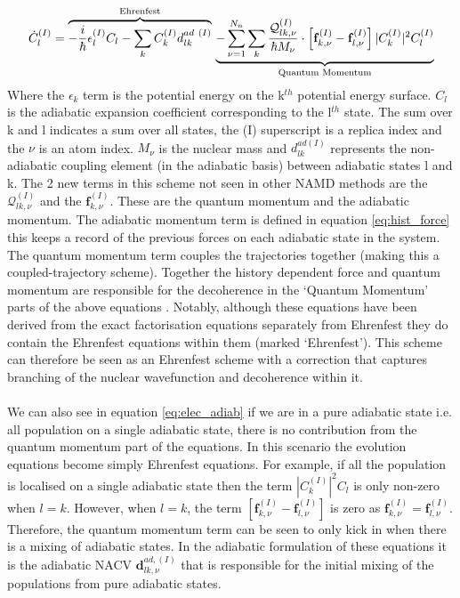 \begin{dmath}
  \dot{C}_{l}^{(I)} =
  \overbrace{
    -\frac{i}{\hbar} \epsilon_l^{(I)} C_{l}
    - \sum_k C_k^{(I)} d_{lk}^{ad \ (I)}
  }^{\text{Ehrenfest}}
  \\
  \underbrace{
    - \sum_{\nu=1}^{N_n}\sum_{k} \frac{\mathcal{Q}_{lk, \nu}^{(I)}}{\hbar M_\nu} \cdot \left[ \mathbf{f}_{k,\nu}^{(I)} - \mathbf{f}_{l,\nu}^{(I)} \right] |C_{k}^{(I)}|^2 C_{l}^{(I)}
  }_{\text{Quantum Momentum}}
  \label{eq:elec_adiab}
\end{dmath}
Where the $\epsilon_k$ term is the potential energy on the k$^{th}$ potential energy surface. $C_l$ is the adiabatic expansion coefficient corresponding to the l$^{th}$ state. The sum over k and l indicates a sum over all states, the (I) superscript is a replica index and the $\nu$ is an atom index. $M_{\nu}$ is  the nuclear mass and $d_{lk}^{ad (I)}$ represents the non-adiabatic coupling element (in the adiabatic basis) between adiabatic states l and k.
The 2 new terms in this scheme not seen in other NAMD methods are the $\mathcal{Q}_{lk, \nu}^{(I)}$ and the $\mathbf{f}_{k, \nu}^{(I)}$. These are the quantum momentum and the adiabatic momentum. The adiabatic momentum term is defined in equation \eqref{eq:hist_force} this keeps a record of the previous forces on each adiabatic state in the system. The quantum momentum term couples the trajectories together (making this a coupled-trajectory scheme). Together the history dependent force and quantum momentum are responsible for the decoherence in the `Quantum Momentum' parts of the above equations \cite{gossel_coupled-trajectory_2018}. Notably, although these equations have been derived from the exact factorisation equations separately from Ehrenfest they do contain the Ehrenfest equations within them (marked `Ehrenfest'). This scheme can therefore be seen as an Ehrenfest scheme with a correction that captures branching of the nuclear wavefunction and decoherence within it.
\\\\
We can also see in equation \eqref{eq:elec_adiab} if we are in a pure adiabatic state i.e. all population on a single adiabatic state, there is no contribution from the quantum momentum part of the equations. In this scenario the evolution equations become simply Ehrenfest equations. For example, if all the population is localised on a single adiabatic state then the term $|C_{k}^{(I)}|^2 C_{l}$ is only non-zero when $l = k$. However, when $l = k$, the term $\left[ \mathbf{f}_{k,\nu}^{(I)} - \mathbf{f}_{l,\nu}^{(I)} \right]$ is zero as $\mathbf{f}_{k,\nu}^{(I)} = \mathbf{f}_{l,\nu}^{(I)}$.
Therefore, the quantum momentum term can be seen to only kick in when there is a mixing of adiabatic states. In the adiabatic formulation of these equations it is the adiabatic NACV $\mathbf{d}_{lk, \nu}^{ad, (I)}$ that is responsible for the initial mixing of the populations from pure adiabatic states.
